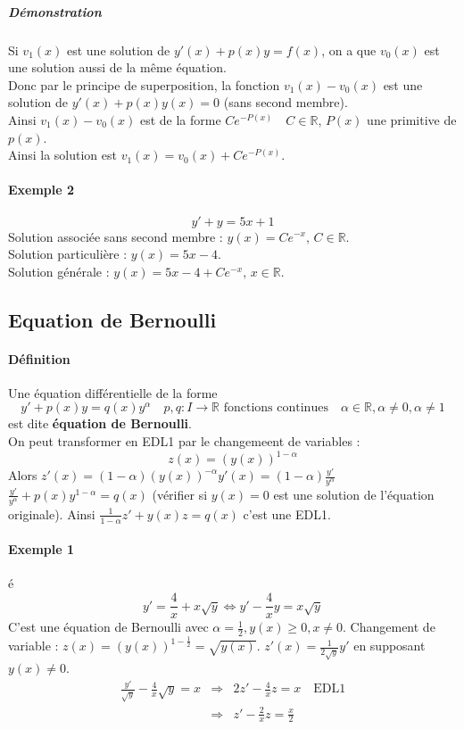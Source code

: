 \message{ !name(analyse-02.tex)}\documentclass[1Opt]{report}
\begin{document}
\subparagraph{Démonstration}
Si $v_1(x)$ est une solution de $y'(x)+p(x)y=f(x)$, on a que $v_0(x)$ est une
solution aussi de la même équation.\\
Donc par le principe de superposition, la fonction $v_1(x)-v_0(x)$ est une
solution de $y'(x)+p(x)y(x)=0$ (sans second membre).\\
Ainsi $v_1(x)-v_0(x)$ est de la forme $Ce^{-P(x)}\quad C\in\mathbb{R}$, $P(x)$
une primitive de $p(x)$.\\
Ainsi la solution est $v_1(x)=v_0(x)+Ce^{-P(x)}$.

\paragraph{Exemple 2}
\[y'+y=5x+1\]
Solution associée sans second membre : $y(x)=Ce^{-x},\,C\in\mathbb{R}$.\\
Solution particulière : $y(x)=5x-4$.\\
Solution générale : $y(x)=5x-4+Ce^{-x},\,x\in\mathbb{R}$.


\subsection{Equation de Bernoulli}

\paragraph{Définition}
Une équation différentielle de la forme
\[y'+p(x)y=q(x)y^\alpha\quad p,q:I\rightarrow\mathbb{R}\mbox{ fonctions continues}\quad\alpha\in\mathbb{R},\alpha\neq0,\alpha\neq1\]
est dite \textbf{équation de Bernoulli}.\\
On peut transformer en EDL1 par le changemeent de variables :
\[z(x)=(y(x))^{1-\alpha}\]
Alors $z'(x)=(1-\alpha)(y(x))^{-\alpha}y'(x)=(1-\alpha)\frac{y'}{y^\alpha}$\\
$\frac{y'}{y^\alpha}+p(x)y^{1-\alpha}=q(x)$  (vérifier si $y(x)=0$ est une
solution de l'équation originale).
Ainsi $\frac{1}{1-\alpha}z'+y(x)z=q(x)$  c'est une EDL1.

\paragraph{Exemple 1}
é\[y'=\frac{4}{x}+x\sqrt{y}\Leftrightarrow y'-\frac{4}{x}y=x\sqrt{y}\]
C'est une équation de Bernoulli avec $\alpha=\frac{1}{2},y(x)\geq0,x\neq0$.
Changement de variable : $z(x)=(y(x))^{1-\frac{1}{2}}=\sqrt{y(x)}$.
$z'(x)=\frac{1}{2\sqrt{y}}y'$ en supposant $y(x)\neq0$.
\begin{eqnarray*}
 \frac{y'}{\sqrt{y}}-\frac{4}{x}\sqrt{y}=x & \Rightarrow & 2z'-\frac{4}{x}z=x
\quad\mbox{EDL1}\\
 & \Rightarrow & z'-\frac{2}{x}z=\frac{x}{2}
\end{eqnarray*}
\end{document}
